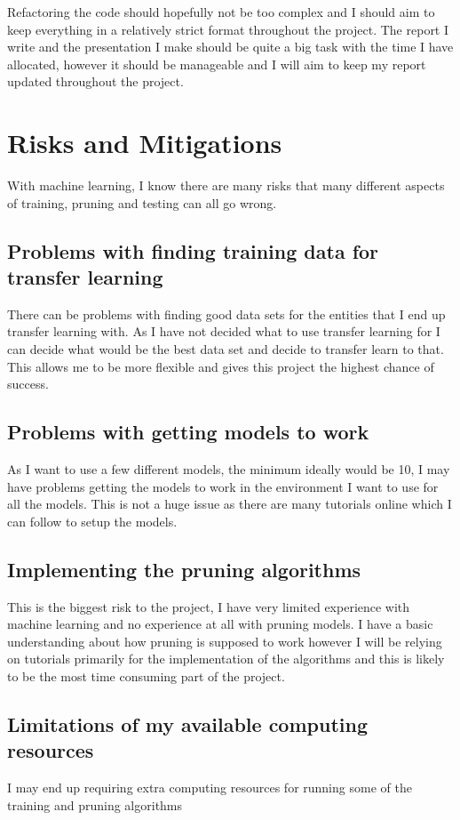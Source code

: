 \documentclass{article}
\begin{document}
Refactoring the code should hopefully not be too complex and I should aim to keep everything in a relatively strict format throughout the project. The report I write and the presentation I make should be quite a big task with the time I have allocated, however it should be manageable and I will aim to keep my report updated throughout the project.

\pagebreak
\section{Risks and Mitigations}
With machine learning, I know there are many risks that many different aspects of training, pruning and testing can all go wrong.

\subsection{Problems with finding training data for transfer learning}
There can be problems with finding good data sets for the entities that I end up transfer learning with. As I have not decided what to use transfer learning for I can decide what would be the best data set and decide to transfer learn to that. This allows me to be more flexible and gives this project the highest chance of success.

\subsection{Problems with getting models to work}
As I want to use a few different models, the minimum ideally would be 10, I may have problems getting the models to work in the environment I want to use for all the models. This is not a huge issue as there are many tutorials online which I can follow to setup the models.

\subsection{Implementing the pruning algorithms}
This is the biggest risk to the project, I have very limited experience with machine learning and no experience at all with pruning models. I have a basic understanding about how pruning is supposed to work however I will be relying on tutorials primarily for the implementation of the algorithms and this is likely to be the most time consuming part of the project.

\subsection{Limitations of my available computing resources}
I may end up requiring extra computing resources for running some of the training and pruning algorithms 
\end{document}
